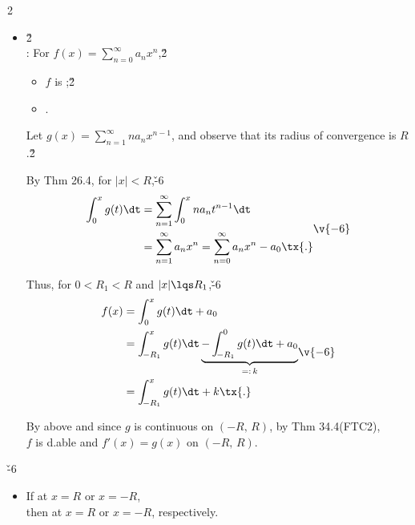 \documentclass[dvipdfmx,a4paper,titlepage,9pt]{jsarticle}
\begin{document}
\begin{multicols*}{2}
\begin{itemize}[label={-}]
\begin{Pfbox}
Thus, by Thm 25.2, we have\v{-6}
$$\begin{aligned}
  \int_{\!x}^0\left(\sum_{n=0}^\infty a_nt^n\!\right)\!\dt&=\lim_{n\to\infty}\int_{\!x}^0\left(\sum_{k=0}^na_kx^k\!\right)\!\dt \\
  &=\lim_{n\to\infty}\sum_{k=0}^n\int_{\!x}^0a_kt^k\dt \\
  &=\sum_{n=0}^\infty\frac{a_n}{n+1}x^{n+1}\tx{.}
  \end{aligned}\v{-6}$$
\end{Pfbox}\;

\item{}\v2\\
: For $f(x)=\sum_{n=0}^\infty a_nx^n$,\v2
\begin{itemize}
\setlength{\leftskip}{5pt}
\item[(i)] $f$ is ;\v2
\item[(ii)] .
\end{itemize}
\begin{Pfbox}
Let $g(x)=\sum_{n=1}^\infty na_nx^{n-1}$, and observe that its radius of convergence is $R$.\v2

By Thm 26.4, for $|x|<R$,\v{-6}
$$\begin{aligned}
  \int_0^xg(t)\dt&=\sum_{n=1}^\infty\int_0^xna_nt^{n-1}\dt\\
  &=\sum_{n=1}^\infty a_nx^n =\sum_{n=0}^\infty a_nx^n-a_0\tx{.}
  \end{aligned}\v{-6}$$
  
Thus, for $0<R_1<R$ and $|x|\lqs R_1$,\v{-6}
$$\begin{aligned}
  f(x)&=\int_0^x g(t)\dt+a_0 \\
      &=\int_{\!-R_1}^xg(t)\dt\underbrace{-\int_{\!-R_1}^0g(t)\dt+a_0}_{=:\,k}\\
      &=\int_{\!-R_1}^xg(t)\dt+k\tx{.}
  \end{aligned}\v{-6}$$

By above and since $g$ is continuous on $(-R,\,R)$, by Thm 34.4(FTC2),\\
$f$ is d.able and $f'(x)=g(x)$ on $(-R,\,R)$.
\end{Pfbox}\;
\end{itemize}

\v{-6}
\begin{itemize}
\item If  at $x=R$ or $x=-R$, \\
then  at $x=R$ or $x=-R$, respectively.
\end{itemize}


\end{multicols*}
\end{document}
